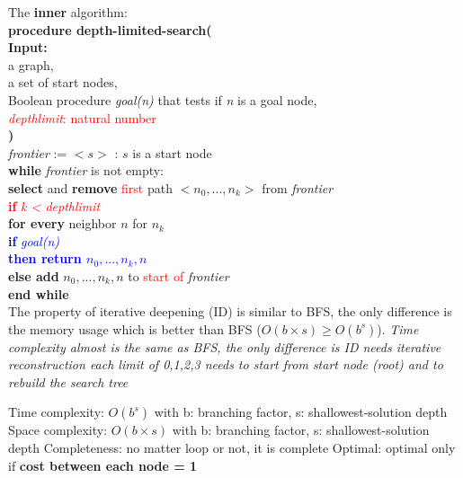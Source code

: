 \noindent
The \textbf{inner} algorithm: \\
\textbf{procedure depth-limited-search(} \\
\tabto{5mm} \textbf{Input:}  \\
\tabto{5mm} a graph, \\
\tabto{5mm} a set of start nodes, \\
\tabto{5mm} Boolean procedure \emph{goal(n)} that tests if \emph{n} is a goal node, \\
\tabto{5mm} \textcolor{red}{\emph{depthlimit}: natural number} \\
\textbf{)} \\
\emph{frontier} := {$<s>$ : $s$ is a start node} \\
\textbf{while} \emph{frontier} is not empty: \\
\tabto{5mm} \textbf{select} and \textbf{remove} \textcolor{red}{first} path $<n_{0},...,n_{k}>$ from \emph{frontier} \\
\tabto{5mm} \textcolor{red}{\textbf{if} \emph{k < depthlimit}} \\
\tabto{10mm} \textbf{for every} neighbor $n$ for $n_{k}$ \\
\tabto{15mm} \textcolor{blue}{\textbf{if} \emph{goal(n)}} \\
\tabto{20mm} \textcolor{blue}{\textbf{then return $n_{0},...,n_{k},n$}} \\
\tabto{15mm} \textbf{else add} $n_{0},...,n_{k},n$ to \textcolor{red}{start of} \emph{frontier} \\
\textbf{end while} \\

\noindent
The property of iterative deepening (ID) is similar to BFS, the only difference is the memory usage which is better than BFS ($O(b \times s) \ge O(b^{s})$). \emph{Time complexity almost is the same as BFS, the only difference is ID needs iterative reconstruction each limit of 0,1,2,3 needs to start from start node (root) and to rebuild the search tree}
\begin{outline}
    \1 Time complexity: $O(b^{s})$
        \2 with b: branching factor, s: shallowest-solution depth
    \1 Space complexity: $O(b \times s)$
        \2 with b: branching factor, s: shallowest-solution depth
    \1 Completeness: no matter loop or not, it is complete
    \1 Optimal: optimal only if \textbf{cost between each node = 1}
\end{outline}

